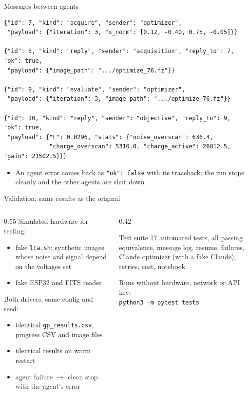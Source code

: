 \documentclass[aspectratio=169,10pt]{beamer}
\begin{document}
\begin{frame}[fragile]{Messages between agents}
\begin{lstlisting}
{"id": 7, "kind": "acquire", "sender": "optimizer",
 "payload": {"iteration": 3, "x_norm": [0.12, -0.40, 0.75, -0.05]}}

{"id": 8, "kind": "reply", "sender": "acquisition", "reply_to": 7, "ok": true,
 "payload": {"image_path": ".../optimize_76.fz"}}

{"id": 9, "kind": "evaluate", "sender": "optimizer",
 "payload": {"iteration": 3, "image_path": ".../optimize_76.fz"}}

{"id": 10, "kind": "reply", "sender": "objective", "reply_to": 9, "ok": true,
 "payload": {"F": 0.0296, "stats": {"noise_overscan": 636.4,
             "charge_overscan": 5310.0, "charge_active": 26812.5, "gain": 21502.5}}}
\end{lstlisting}
  \small
  \begin{itemize}
    \item An agent error comes back as \texttt{"ok": false} with its traceback;
          the run stops cleanly and the other agents are shut down
  \end{itemize}
\end{frame}

\begin{frame}{Validation: same results as the original}
  \begin{columns}[T]
    \begin{column}{0.55\textwidth}
      Simulated hardware for testing:
      \begin{itemize}\small
        \item fake \texttt{lta.sh}: synthetic images whose noise and signal
              depend on the voltages set
        \item fake ESP32 and FITS reader
      \end{itemize}
      Both drivers, same config and seed:
      \begin{itemize}\small
        \item identical \texttt{gp\_results.csv}, progress CSV and image files
        \item identical results on warm restart
        \item agent failure $\rightarrow$ clean stop with the agent's error
      \end{itemize}
    \end{column}
    \begin{column}{0.42\textwidth}
      \begin{block}{Test suite}
        \small
        17 automated tests, all passing\\[1mm]
        equivalence, message log, resume, failures,
        Claude optimizer (with a fake Claude), retries, cost, notebook
      \end{block}
      \vspace{2mm}
      {\scriptsize Runs without hardware, network or API key:\\
       \texttt{python3 -m pytest tests}}
    \end{column}
  \end{columns}
\end{frame}
\end{document}
